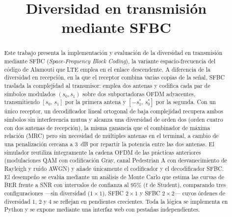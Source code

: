 \documentclass[conference,onecolumn]{IEEEtran}
\begin{document}
\title{Diversidad en transmisi\'on mediante SFBC}

\author{
\and
{}
}

\maketitle

\begin{abstract}
Este trabajo presenta la implementaci\'on y evaluaci\'on de la diversidad en transmisi\'on mediante SFBC (\textit{Space-Frequency Block Coding}), la variante espacio-frecuencia del c\'odigo de Alamouti que LTE emplea en el enlace descendente. A diferencia de la diversidad en recepci\'on, en la que el receptor combina varias copias de la se\~nal, SFBC traslada la complejidad al transmisor: emplea dos antenas y codifica cada par de s\'imbolos modulados $(s_0,s_1)$ sobre dos subportadoras OFDM adyacentes, transmitiendo $[s_0,\,s_1]$ por la primera antena y $[-s_1^{*},\,s_0^{*}]$ por la segunda. Con un \'unico receptor, un decodificador lineal ortogonal de baja complejidad recupera ambos s\'imbolos sin interferencia mutua y alcanza una diversidad de orden dos (orden cuatro con dos antenas de recepci\'on), la misma ganancia que el combinador de m\'axima relaci\'on (MRC) pero sin necesidad de m\'ultiples antenas en el terminal, a cambio de una penalizaci\'on cercana a $3$~dB por repartir la potencia entre las dos antenas. El simulador reutiliza \'integramente la cadena OFDM de las pr\'acticas anteriores (modulaciones QAM con codificaci\'on Gray, canal Pedestrian A con desvanecimiento de Rayleigh y ruido AWGN) y a\~nade \'unicamente el codificador y el decodificador SFBC. El desempe\~no se eval\'ua mediante un an\'alisis de Monte Carlo que estima las curvas de BER frente a SNR con intervalos de confianza al $95\%$ ($t$ de Student), comparando tres configuraciones ---sin diversidad ($1\times1$), SFBC $2\times1$ y SFBC $2\times2$--- cuyos \'ordenes de diversidad $1$, $2$ y $4$ se reflejan en pendientes crecientes. Toda la l\'ogica se implementa en Python y se expone mediante una interfaz web con pesta\~nas independientes.
\end{abstract}
\end{document}
